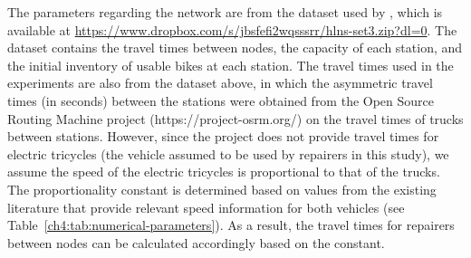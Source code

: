 The parameters regarding the network are from the dataset used by \citet{hoHybridLargeNeighborhood2017}, which is
available at \url{https://www.dropbox.com/s/jbsfefi2wqsssrr/hlns-set3.zip?dl=0}. The dataset contains the
travel times between nodes, the capacity of each station, and the initial inventory of usable bikes
at each station. The travel times used in the experiments are also from the dataset above, in which
the asymmetric travel times (in seconds) between the stations were obtained from the Open Source
Routing Machine project (https://project-osrm.org/) on the travel times of trucks between stations.
However, since the project does not provide travel times for electric tricycles (the vehicle assumed
to be used by repairers in this study), we assume the speed of the electric tricycles is
proportional to that of the trucks. The proportionality constant is determined based on values from
the existing literature that provide relevant speed information for both vehicles (see Table~\ref{ch4:tab:numerical-parameters}).
As a result, the travel times for repairers between nodes can be calculated accordingly based on the
constant.

